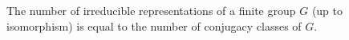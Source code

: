 The number of irreducible representations of a finite group $G$ (up to isomorphism) is equal to the number of conjugacy classes of $G$.